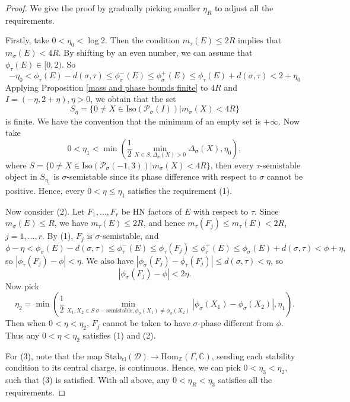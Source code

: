 \documentclass[a4paper,12pt]{amsart}
\numberwithin{equation}{section}
\newcommand{\Hom}{\mathrm{Hom}}
\newcommand{\Stab}{\mathrm{Stab}}
\newcommand{\Iso}{\mathrm{Iso}}
\newcommand{\cl}{\mathrm{cl}}
\newcommand{\1}{\mathbf{1}}
\begin{document}
\begin{proof}
    We give the proof by gradually picking smaller $\eta_R$ to adjust all the requirements.

    Firstly, take $0<\eta_0<\log2$. Then the condition $m_\tau(E)\leqslant2R$ implies that $m_\sigma(E)<4R$. By shifting by an even number, we can assume that $\phi_\tau(E)\in[0,2)$. So
    \[-\eta_0<\phi_\tau(E)-d(\sigma,\tau)\leqslant\phi_\sigma^-(E)\leqslant\phi_\sigma^+(E)\leqslant\phi_\tau(E)+d(\sigma,\tau)<2+\eta_0\]
    Applying Proposition \ref{mass and phase bounds finite} to $4R$ and $I=(-\eta,2+\eta),\eta>0$, we obtain that the set
    \[S_\eta=\{0\neq X\in\Iso(\mathcal{P}_\sigma(I))|m_\sigma(X)<4R\}\]
    is finite. We have the convention that the minimum of an empty set is $+\infty$. Now take
    \[0<\eta_1<\min\left(\dfrac12\min_{X\in S,\Delta_\sigma(X)>0}\Delta_\sigma(X),\eta_0\right),\]
    where $S=\{0\neq X\in\Iso(\mathcal{P}_\sigma(-1,3))|m_\sigma(X)<4R\}$, then every $\tau$-semistable object in $S_{\eta_1}$ is $\sigma$-semistable since its phase difference with respect to $\sigma$ cannot be positive. Hence, every $0<\eta\leqslant\eta_1$ satisfies the requirement (1).

    Now consider (2). Let $F_1,\dots,F_r$ be HN factors of $E$ with respect to $\tau$. Since $m_\sigma(E)\leqslant R$, we have $m_\tau(E)\leqslant 2R$, and hence $m_\tau(F_j)\leqslant m_\tau(E)<2R$, $j=1,\dots,r$. By (1), $F_j$ is $\sigma$-semistable, and
    \[\phi-\eta<\phi_\sigma(E)-d(\sigma,\tau)\leqslant\phi_\tau^-(E)\leqslant\phi_\tau(F_j)\leqslant\phi_\tau^+(E)\leqslant\phi_\sigma(E)+d(\sigma,\tau)<\phi+\eta,\]
    so $|\phi_\tau(F_j)-\phi|<\eta$. We also have $|\phi_\sigma(F_j)-\phi_\tau(F_j)|\leqslant d(\sigma,\tau)<\eta$, so
    \[|\phi_\sigma(F_j)-\phi|<2\eta.\]
    Now pick
    \[\eta_2=\min\left(\dfrac12\min_{X_1,X_2\in S\ \sigma-\text{semistable},\phi_\sigma(X_1)\neq\phi_\sigma(X_2)}|\phi_\sigma(X_1)-\phi_\sigma(X_2)|,\eta_1\right).\]
    Then when $0<\eta<\eta_2$, $F_j$ cannot be taken to have $\sigma$-phase different from $\phi$. Thus any $0<\eta<\eta_2$ satisfies (1) and (2).

    For (3), note that the map $\Stab_\cl(\mathcal{D})\rightarrow\Hom_{\mathbb{Z}}(\Gamma,\mathbb{C})$, sending each stability condition to its central charge, is continuous. Hence, we can pick $0<\eta_3<\eta_2$, such that (3) is satisfied. With all above, any $0<\eta_R<\eta_3$ satisfies all the requirements.
\end{proof}
\end{document}
